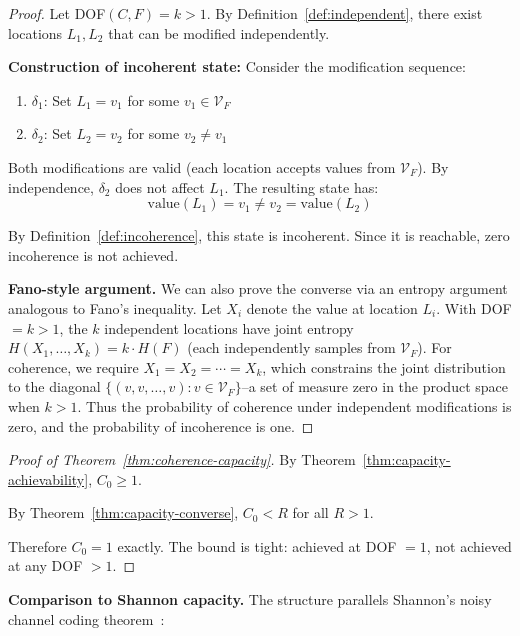 \begin{proof}
Let DOF$(C, F) = k > 1$. By Definition~\ref{def:independent}, there exist locations $L_1, L_2$ that can be modified independently.

\textbf{Construction of incoherent state:} Consider the modification sequence:
\begin{enumerate}
\tightlist
\item $\delta_1$: Set $L_1 = v_1$ for some $v_1 \in \mathcal{V}_F$
\item $\delta_2$: Set $L_2 = v_2$ for some $v_2 \neq v_1$
\end{enumerate}

Both modifications are valid (each location accepts values from $\mathcal{V}_F$). By independence, $\delta_2$ does not affect $L_1$. The resulting state has:
\[
\text{value}(L_1) = v_1 \neq v_2 = \text{value}(L_2)
\]

By Definition~\ref{def:incoherence}, this state is incoherent. Since it is reachable, zero incoherence is not achieved.

\textbf{Fano-style argument.} We can also prove the converse via an entropy argument analogous to Fano's inequality. Let $X_i$ denote the value at location $L_i$. With DOF $= k > 1$, the $k$ independent locations have joint entropy $H(X_1, \ldots, X_k) = k \cdot H(F)$ (each independently samples from $\mathcal{V}_F$). For coherence, we require $X_1 = X_2 = \cdots = X_k$, which constrains the joint distribution to the diagonal $\{(v, v, \ldots, v) : v \in \mathcal{V}_F\}$--a set of measure zero in the product space when $k > 1$. Thus the probability of coherence under independent modifications is zero, and the probability of incoherence is one.
\end{proof}

\begin{proof}[Proof of Theorem~\ref{thm:coherence-capacity}]
By Theorem~\ref{thm:capacity-achievability}, $C_0 \geq 1$.

By Theorem~\ref{thm:capacity-converse}, $C_0 < R$ for all $R > 1$.

Therefore $C_0 = 1$ exactly. The bound is tight: achieved at DOF $= 1$, not achieved at any DOF $> 1$.
\end{proof}

\textbf{Comparison to Shannon capacity.} The structure parallels Shannon's noisy channel coding theorem~\cite{shannon1948mathematical}:

